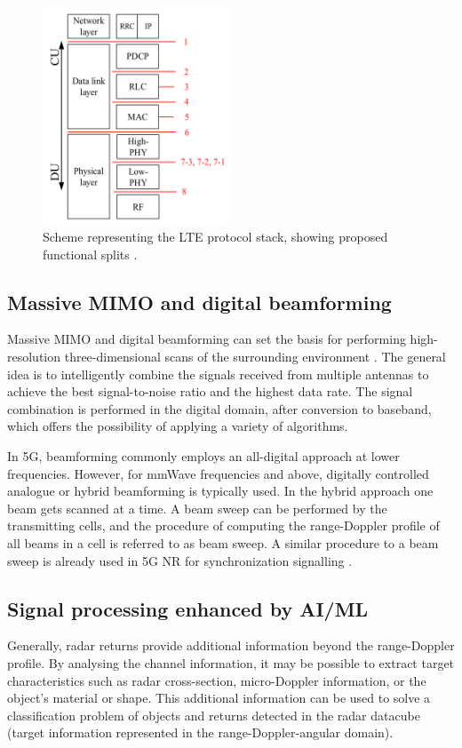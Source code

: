 	\begin{figure}[H]
		\centering
		\includegraphics[width=0.5\textwidth]{Images/overview/5Gsplits_Larsen.png}
		\caption{Scheme representing the LTE protocol stack, showing proposed functional splits \cite{Larsen_Checko_Christiansen_2019}. }
		\label{fig:Overview-LTE_stack_splits}
	\end{figure}
	 
	
	\subsection{Massive MIMO and digital beamforming}
	
	Massive MIMO and digital beamforming can set the basis for performing high-resolution three-dimensional scans of the surrounding environment \cite{MIMO-next-gen}.
	The general idea is to intelligently combine the signals received from multiple antennas to achieve the best signal-to-noise ratio and the highest data rate. The signal combination is performed in the digital domain, after conversion to baseband, which offers the possibility of applying a variety of algorithms.
	
	In 5G, beamforming commonly employs an all-digital approach at lower frequencies. However, for mmWave frequencies and above, digitally controlled analogue or hybrid beamforming is typically used. In the hybrid approach one beam gets scanned at a time. A beam sweep can be performed by the transmitting cells, and the procedure of computing the range-Doppler profile of all beams in a cell is referred to as beam sweep. A similar procedure to a beam sweep is already used in 5G NR for synchronization signalling \cite{Wild_Braun_Viswanathan_2021}.
	
	\subsection{Signal processing enhanced by AI/ML}
	Generally, radar returns provide additional information beyond the range-Doppler profile. 
	By analysing the channel information, it may be possible to extract target characteristics such as radar cross-section, micro-Doppler information, or the object's material or shape.
	This additional information can be used to solve a classification problem of objects and returns detected in the radar datacube (target information represented in the range-Doppler-angular domain).
	

